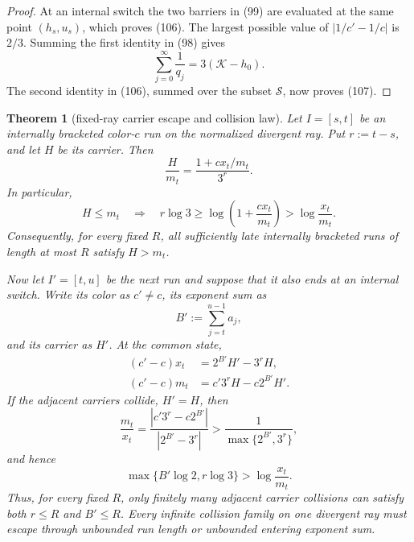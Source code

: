 \documentclass[11pt]{article}
\newtheorem{theorem}{Theorem}
\begin{document}
\begin{proof}
At an internal switch the two barriers in (99) are evaluated at the same
point $(h_s,u_s)$, which proves (106).  The largest possible value of
$|1/c'-1/c|$ is $2/3$.  Summing the first identity in (98) gives
\[
  \sum_{j=0}^{\infty}\frac1{q_j}
  =3(\mathcal K-h_0).
\]
The second identity in (106), summed over the subset $\mathcal S$, now
proves (107).
\end{proof}

\begin{theorem}[fixed-ray carrier escape and collision law]
Let $I=[s,t]$ be an internally bracketed color-$c$ run on the normalized
divergent ray.  Put $r:=t-s$, and let $H$ be its carrier.  Then
\[
\boxed{
  \frac{H}{m_t}
  =\frac{1+c x_t/m_t}{3^r}.}
\tag{109}
\]
In particular,
\[
  H\leq m_t
  \quad\Longrightarrow\quad
  r\log3\geq\log\left(1+\frac{cx_t}{m_t}\right)
  >\log\frac{x_t}{m_t}.
\tag{110}
\]
Consequently, for every fixed $R$, all sufficiently late internally
bracketed runs of length at most $R$ satisfy $H>m_t$.

Now let $I'=[t,u]$ be the next run and suppose that it also ends at an
internal switch.  Write its color as $c'\neq c$, its exponent sum as
\[
  B':=\sum_{j=t}^{u-1}a_j,
\]
and its carrier as $H'$.  At the common state,
\[
\boxed{\begin{aligned}
  (c'-c)x_t&=2^{B'}H'-3^rH,\\
  (c'-c)m_t&=c'3^rH-c2^{B'}H'.
\end{aligned}}
\tag{111}
\]
If the adjacent carriers collide, $H'=H$, then
\[
\boxed{
  \frac{m_t}{x_t}
  =\frac{|c'3^r-c2^{B'}|}{|2^{B'}-3^r|}
  >\frac1{\max\{2^{B'},3^r\}},}
\tag{112}
\]
and hence
\[
  \max\{B'\log2,r\log3\}>\log\frac{x_t}{m_t}.
\tag{113}
\]
Thus, for every fixed $R$, only finitely many adjacent carrier collisions
can satisfy both $r\leq R$ and $B'\leq R$.  Every infinite collision family
on one divergent ray must escape through unbounded run length or unbounded
entering exponent sum.
\end{theorem}
\end{document}
